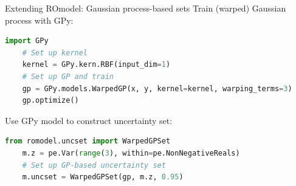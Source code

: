 \documentclass[slides,aspectratio=169]{beamer}
\begin{document}
\begin{frame}[fragile]{Extending ROmodel: Gaussian process-based sets}
    Train (warped) Gaussian process with GPy:
    \begin{lstlisting}[language=Python]
    import GPy
    # Set up kernel
    kernel = GPy.kern.RBF(input_dim=1)
    # Set up GP and train
    gp = GPy.models.WarpedGP(x, y, kernel=kernel, warping_terms=3)
    gp.optimize()
    \end{lstlisting}
    Use GPy model to construct uncertainty set:
    \begin{lstlisting}[language=Python]
    from romodel.uncset import WarpedGPSet
    m.z = pe.Var(range(3), within=pe.NonNegativeReals)
    # Set up GP-based uncertainty set
    m.uncset = WarpedGPSet(gp, m.z, 0.95)
    \end{lstlisting}
\end{frame}
\end{document}
